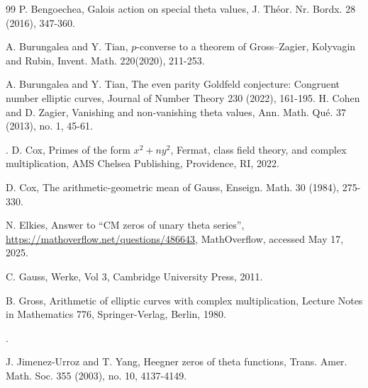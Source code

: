 \documentclass[11pt, reqno]{amsart}
\theoremstyle{plain}
\theoremstyle{definition}
\numberwithin{equation}{section}
\begin{document}
\begin{thebibliography}{99}
 P. Bengoechea, Galois action on special theta values, J. Th{\'e}or. Nr. Bordx. 28 (2016),  347-360.



 A. Burungalea and Y. Tian, $p$-converse to a theorem of Gross–Zagier, Kolyvagin and Rubin, Invent. Math. 220(2020), 211-253. 

 A. Burungalea and Y. Tian, The even parity Goldfeld conjecture: Congruent
number elliptic curves, Journal of Number Theory 230 (2022),  161-195.
 H. Cohen and D. Zagier, Vanishing and non-vanishing theta values, Ann. Math. Qué. 37 (2013), no. 1,  45-61.

.
 {D.  Cox,  {Primes of the form $x^2+ny^2$, Fermat, class field theory, and complex multiplication},
AMS Chelsea Publishing, Providence, RI, 2022. }

   D.   Cox,   The arithmetic-geometric mean of
Gauss, Enseign. Math. 30 (1984), 275-330. 


 N. Elkies, Answer to ``CM zeros of unary theta series'',
 {\url{https://mathoverflow.net/questions/486643}},
  MathOverflow, accessed May 17, 2025.


   C.  Gauss,  {Werke}, Vol 3,  Cambridge University Press, 2011. 

    B. Gross, Arithmetic of elliptic curves with complex multiplication, Lecture Notes in
Mathematics 776, Springer-Verlag, Berlin, 1980.

.


J. Jimenez-Urroz and T. Yang, 
Heegner zeros of theta functions, 
Trans. Amer. Math. Soc. 355 (2003), no. 10, 4137-4149.


\end{thebibliography}
\end{document}
